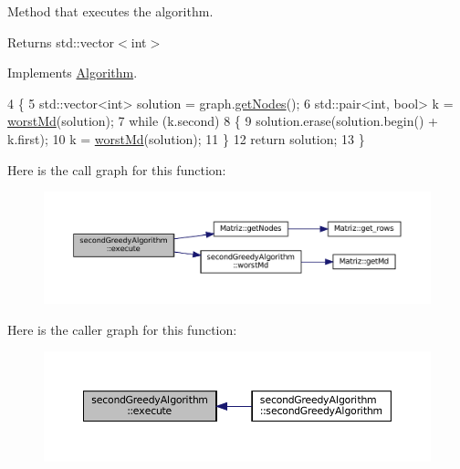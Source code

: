 Method that executes the algorithm. 

\begin{DoxyReturn}{Returns}
std\+::vector$<$int$>$ 
\end{DoxyReturn}


Implements \hyperlink{classAlgorithm_af6ea9eb9a6dbd41896e3fd7dabac096b}{Algorithm}.


\begin{DoxyCode}
4 \{
5   std::vector<int> solution = graph.\hyperlink{classMatriz_a394b84a5ec13fd2f4d202ab218680afe}{getNodes}();
6   std::pair<int, bool> k = \hyperlink{classsecondGreedyAlgorithm_a714fa858b1666fc77153890ac16f1b3f}{worstMd}(solution);
7   \textcolor{keywordflow}{while} (k.second)
8   \{
9     solution.erase(solution.begin() + k.first);
10     k = \hyperlink{classsecondGreedyAlgorithm_a714fa858b1666fc77153890ac16f1b3f}{worstMd}(solution);
11   \}
12   \textcolor{keywordflow}{return} solution;
13 \}
\end{DoxyCode}
Here is the call graph for this function\+:
\nopagebreak
\begin{figure}[H]
\begin{center}
\leavevmode
\includegraphics[width=350pt]{classsecondGreedyAlgorithm_a119a730116003d00438179ccf4e2cafd_cgraph}
\end{center}
\end{figure}
Here is the caller graph for this function\+:
\nopagebreak
\begin{figure}[H]
\begin{center}
\leavevmode
\includegraphics[width=350pt]{classsecondGreedyAlgorithm_a119a730116003d00438179ccf4e2cafd_icgraph}
\end{center}
\end{figure}
\mbox{\label{classsecondGreedyAlgorithm_a714fa858b1666fc77153890ac16f1b3f}} 
